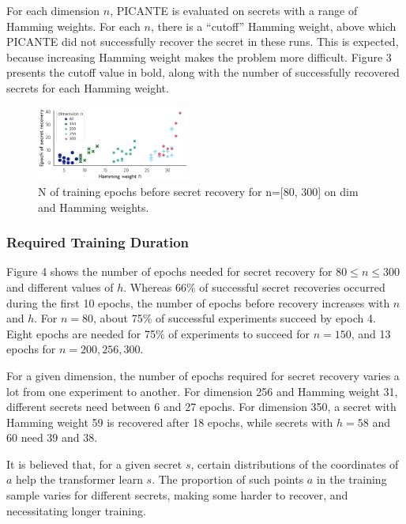\documentclass{article}
\begin{document}
For each dimension \( n \), PICANTE is evaluated on secrets with a range of Hamming weights. For each \( n \), there is a “cutoff” Hamming weight, above which PICANTE did not successfully recover the secret in these runs. This is expected, because increasing Hamming weight makes the problem more difficult. Figure 3 presents the cutoff value in bold, along with the number of successfully recovered secrets for each Hamming weight.

\begin{figure}[h]
    \centering
    \includegraphics[width=0.45\textwidth]{Materials/Picante_performance_chart.png}
    \caption{N of training epochs before secret recovery for n=[80, 300] on dim and Hamming weights.}
    \label{fig:picante_performance_chart}
\end{figure}

\subsubsection{Required Training Duration}

Figure 4 shows the number of epochs needed for secret recovery for \(80 \leq n \leq 300\) and different values of \(h\). Whereas 66\% of successful secret recoveries occurred during the first 10 epochs, the number of epochs before recovery increases with \(n\) and \(h\). For \(n = 80\), about 75\% of successful experiments succeed by epoch 4. Eight epochs are needed for 75\% of experiments to succeed for \(n = 150\), and 13 epochs for \(n = 200, 256, 300\).

For a given dimension, the number of epochs required for secret recovery varies a lot from one experiment to another. For dimension 256 and Hamming weight 31, different secrets need between 6 and 27 epochs. For dimension 350, a secret with Hamming weight 59 is recovered after 18 epochs, while secrets with \(h = 58\) and 60 need 39 and 38.

It is believed that, for a given secret \(s\), certain distributions of the coordinates of \(a\) help the transformer learn \(s\). The proportion of such points \(a\) in the training sample varies for different secrets, making some harder to recover, and necessitating longer training.
\end{document}
